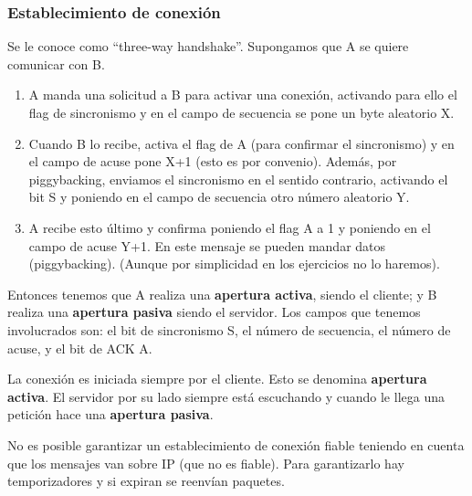 \subsubsection{Establecimiento de conexión}
Se le conoce como ``three-way handshake''. Supongamos que A se quiere comunicar con B. 
\begin{enumerate}
    \item A manda una solicitud a B para activar una conexión, activando para ello el flag de sincronismo y en el campo de secuencia se pone un byte aleatorio X.
    \item Cuando B lo recibe, activa el flag de A (para confirmar el sincronismo) y en el campo de acuse pone X+1 (esto es por convenio). Además, por piggybacking, enviamos el sincronismo en el sentido contrario, activando el bit S y poniendo en el campo de secuencia otro número aleatorio Y.
    \item A recibe esto último y confirma poniendo el flag A a 1 y poniendo en el campo de acuse Y+1. En este mensaje se pueden mandar datos (piggybacking). (Aunque por simplicidad en los ejercicios no lo haremos).
\end{enumerate}
Entonces tenemos que A realiza una \textbf{apertura activa}, siendo el cliente; y B realiza una \textbf{apertura pasiva} siendo el servidor. Los campos que tenemos involucrados son: el bit de sincronismo S, el número de secuencia, el número de acuse, y el bit de ACK A.

La conexión es iniciada siempre por el cliente. Esto se denomina \textbf{apertura activa}. El servidor por su lado siempre está escuchando y cuando le llega una petición hace una \textbf{apertura pasiva}.

\begin{observacion}
    No es posible garantizar un establecimiento de conexión fiable teniendo en cuenta que los mensajes van sobre IP (que no es fiable). Para garantizarlo hay temporizadores y si expiran se reenvían paquetes. 
\end{observacion}

